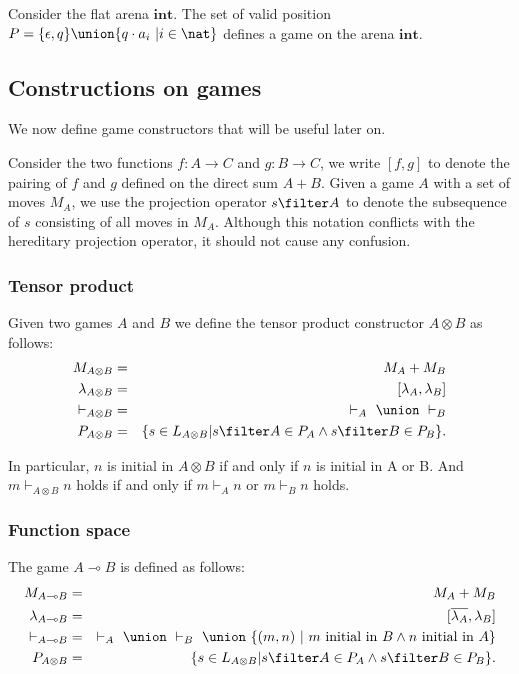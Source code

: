 \begin{example}Consider the flat arena  $\mathbf{int}$.
The set of valid position $P = \{ \epsilon, q \} \union \{ q \cdot
a_i \ | i \in \nat \}$ defines a game on the arena $\mathbf{int}$.
\end{example}

\subsection{Constructions on games}
\label{sec:gameconstruction}

We now define game constructors that will be useful later on.

Consider the two functions $f : A \rightarrow C$ and $g : B
\rightarrow C$, we write $[f,g]$ to denote the pairing of $f$ and
$g$ defined on the direct sum $A + B$. Given a game $A$ with a set
of moves $M_A$, we use the projection operator $s \filter A$ to
denote the subsequence of $s$ consisting of all moves in $M_A$.
Although this notation conflicts with the hereditary projection
operator, it should not cause any confusion.

\subsubsection{Tensor product}
Given two games $A$ and $B$ we define the tensor product constructor
$A \otimes B$ as follows:
\begin{eqnarray*}
  M_{A \otimes B} &=& M_A + M_B \\
  \lambda_{A\otimes B} &=& [\lambda_A,\lambda_B] \\
  \vdash_{A\otimes B} & = & \vdash_{A}\ \union\ \vdash_{B} \\
  P_{A\otimes B} & = & \{ s \in L_{A\otimes B} | s \filter A \in P_A \wedge s \filter B \in P_B  \}.
\end{eqnarray*}

In particular,  $n$ is initial in $A\otimes B$ if and only if $n$ is
initial in A or B. And $m \vdash_{A\otimes B} n$  holds if and only if $m
\vdash_{A} n$ or $m \vdash_{B} n$ holds.

\subsubsection{Function space}
The game $A \multimap B$ is defined as follows:
\begin{eqnarray*}
  M_{A \multimap B} &=& M_A + M_B \\
  \lambda_{A\multimap B} &=& [\overline{\lambda_A},\lambda_B] \\
  \vdash_{A\multimap B} & = & \vdash_{A}\ \union\ \vdash_{B}\ \union\  \{ (m,n) \ |\ m \mbox{ initial in } B \wedge n \mbox{ initial in } A \} \\
  P_{A\otimes B} & = & \{ s \in L_{A\otimes B} | s \filter A \in P_A \wedge s \filter B \in P_B  \}.
\end{eqnarray*}

